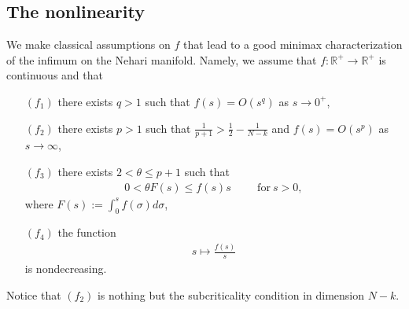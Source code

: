 \documentclass[a4paper]{amsart}
\begin{document}
\subsection{The nonlinearity}
We make classical assumptions on $f$ that lead to a good minimax characterization of the infimum on the Nehari
manifold. Namely, we assume that $f : {\mathbb{R}}^+ \rightarrow {\mathbb{R}}^+$ is continuous and that
\begin{itemize}
 \item[$(f_1)$] there exists $q>1$ such that $f(s) = O(s^q)$ as $s \rightarrow 0^+$,
 \item[$(f_2)$] there exists $p>1$ such that $\frac{1}{p+1} > \frac{1}{2} - \frac{1}{N-k}$ and $f(s) = O(s^p)$ as $s
\rightarrow \infty$,
 \item[$(f_3)$] there exists $2 < \theta \leq p+1$ such that
 \begin{align*}
  0 < \theta F(s) \leq f(s)s \hspace{1cm} \text{for}\ s>0,
 \end{align*}
 where $F(s) := \int_0^s f(\sigma) d\sigma$,
 \item[$(f_4)$] the function
 \begin{align*}
 s \mapsto \frac{f(s)}{s}
 \end{align*}
 is nondecreasing.
\end{itemize}
Notice that $(f_2)$ is nothing but the subcriticality condition in dimension $N-k$.
\end{document}
